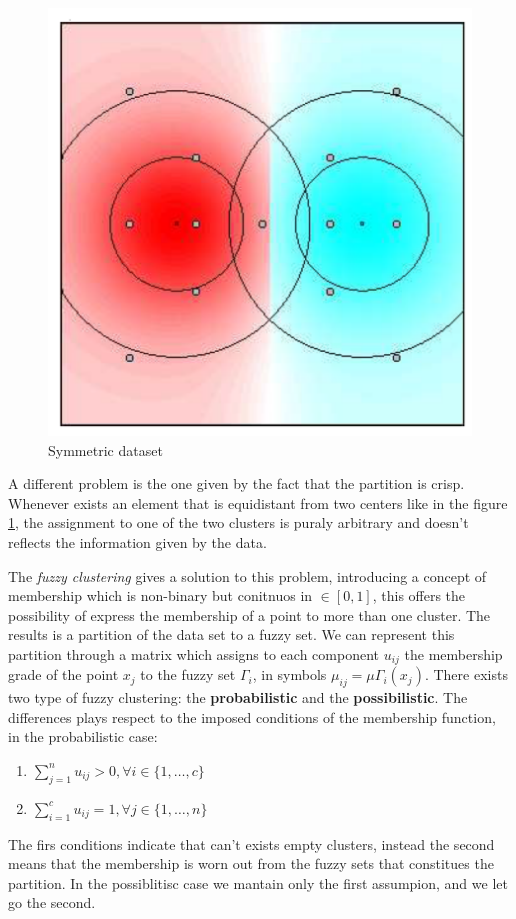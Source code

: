 \documentclass{article}
\begin{document}
\begin{figure}[H]
    \centering
    \includegraphics[scale=0.5]{images/equidistant.png}
    \caption{Symmetric dataset}
    \label{fig:symds}
\end{figure}
A different problem is the one given by the fact that the partition is crisp. Whenever
exists an element that is equidistant from two centers like in the figure \ref{fig:symds},
the assignment to one of the two clusters is puraly arbitrary and doesn't reflects
the information given by the data.

The \textit{fuzzy clustering} gives a solution to this problem, introducing a concept
of membership which is non-binary but conitnuos in $\in[0,1]$, this offers the possibility
of express the membership of a point to more than one cluster. The results is a partition
of the data set to a fuzzy set. We can represent this partition through a matrix which
assigns to each component $u_{ij}$ the membership grade of the point $x_j$ to
the fuzzy set $\Gamma_i$, in symbols $\mu_{ij}=\mu\Gamma_i(x_j)$. There exists two
type of fuzzy clustering: the \textbf{probabilistic} and the \textbf{possibilistic}. The
differences plays respect to the imposed conditions of the membership function, in the
probabilistic case:
\begin{enumerate}
    \item $\sum_{j=1}^n u_{ij}>0, \forall i\in\{1,\dots,c\}$
    \item $\sum_{i=1}^c u_{ij}=1, \forall j\in\{1,\dots,n\}$
\end{enumerate}
The firs conditions indicate that can't exists empty clusters, instead the second
means that the membership is worn out from the fuzzy sets that constitues the partition.
In the possiblitisc case we mantain only the first assumpion, and we let go the second.
\end{document}
